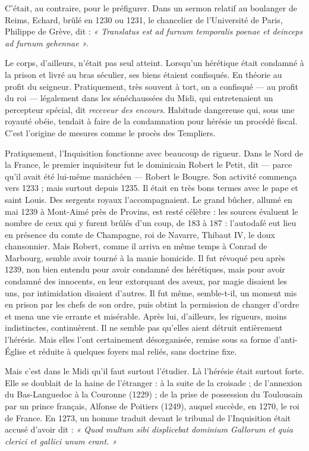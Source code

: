 \documentclass[french,twoside]{book} %
\begin{document}
\noindent C’était, au contraire, pour le préfigurer. Dans un sermon relatif au boulanger de Reims, Echard, brûlé en 1230 ou 1231, le chancelier de l’Université de Paris, Philippe de Grève, dit : \emph{« Translatus est ad furnum temporalis poenae et deinceps ad furnum gehennae »}.\par
Le corps, d’ailleurs, n’était pas seul atteint. Lorsqu’un hérétique était condamné à la prison et livré au bras séculier, ses biens étaient confisqués. En théorie au profit du seigneur. Pratiquement, très souvent à tort, on a confisqué — au profit du roi — légalement dans les sénéchaussées du Midi, qui entretenaient un percepteur spécial, dit \emph{receveur des encours}. Habitude dangereuse qui, sous une royauté obéie, tendait à faire de la condamnation pour hérésie un procédé fiscal. C’est l’origine de mesures comme le procès des Templiers.\par
Pratiquement, l’Inquisition fonctionne avec beaucoup de rigueur. Dans le Nord de la France, le premier inquisiteur fut le dominicain Robert le Petit, dit — parce qu’il avait été lui-même manichéen — Robert le Bougre. Son activité commença vers 1233 ; mais surtout depuis 1235. Il était en très bons termes avec le pape et saint Louis. Des sergents royaux l’accompagnaient. Le grand bûcher, allumé en mai 1239 à Mont-Aimé près de Provins, est resté célèbre : les sources évaluent le nombre de ceux qui y furent brûlés d’un coup, de 183 à 187 : l’autodafé eut lieu en présence du comte de Champagne, roi de Navarre, Thibaut IV, le doux chansonnier. Mais Robert, comme il arriva en même temps à Conrad de Marbourg, semble avoir tourné à la manie homicide. Il fut révoqué peu après 1239, non bien entendu pour avoir condamné des hérétiques, mais pour avoir condamné des innocents, en leur extorquant des aveux, par magie disaient les uns, par intimidation disaient d’autres. Il fut même, semble-t-il, un moment mis en prison par les chefs de son ordre, puis obtint la permission de changer d’ordre et mena une vie  
\label{p107} errante et misérable. Après lui, d’ailleurs, les rigueurs, moins indistinctes, continuèrent. Il ne semble pas qu’elles aient détruit entièrement l’hérésie. Mais elles l’ont certainement désorganisée, remise sous sa forme d’anti-Église et réduite à quelques foyers mal reliés, sans doctrine fixe.\par
Mais c’est dans le Midi qu’il faut surtout l’étudier. Là l’hérésie était surtout forte. Elle se doublait de la haine de l’étranger : à la suite de la croisade ; de l’annexion du Bas-Languedoc à la Couronne (1229) ; de la prise de possession du Toulousain par un prince français, Alfonse de Poitiers (1249), auquel succède, en 1270, le roi de France. En 1273, un homme traduit devant le tribunal de l’Inquisition était accusé d’avoir dit : \emph{« Quod multum sibi displicebat dominium Gallorum et quia clerici et gallici unum erant. »}\par
\end{document}
